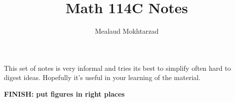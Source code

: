 \documentclass{article}
\title{Math 114C Notes}
\author{Mealaud Mokhtarzad}
\date{}
\begin{document}
\maketitle

This set of notes is very informal and tries its best to simplify often hard to digest ideas. Hopefully it's useful in your learning of the material.

\textbf{FINISH: put figures in right places}

\newpage

\renewcommand{\headrulewidth}{0pt}
\tableofcontents
\newpage

\renewcommand{\headrulewidth}{0.4pt}


\newpage

\end{document}
